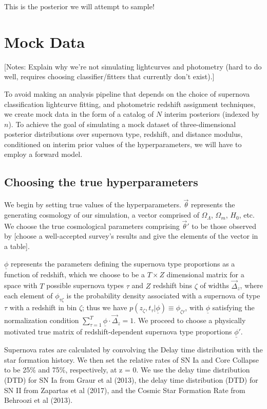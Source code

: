 \documentclass[12pt, onecolumn]{emulateapj}
\newcommand{\textul}{\underline}
\begin{document}
This is the posterior we will attempt to sample!

\section{Mock Data}
\label{sec:data}

[Notes: Explain why we're not simulating lightcurves and photometry (hard to do well, requires choosing classifier/fitters that currently don't exist).]

To avoid making an analysis pipeline that depends on the choice of supernova classification lightcurve fitting, and photometric redshift assignment techniques, we create mock data in the form of a catalog of $N$ interim posteriors (indexed by $n$).  To achieve the goal of simulating a mock dataset of three-dimensional posterior distributions over supernova type, redshift, and distance modulus, conditioned on interim prior values of the hyperparameters, we will have to employ a forward model.

\subsection{Choosing the true hyperparameters}
\label{sec:true_hypers}

We begin by setting true values of the hyperparameters.  $\vec{\theta}$ represents the generating cosmology of our simulation, a vector comprised of $\Omega_{\Lambda}$, $\Omega_{m}$, $H_{0}$, etc.  We choose the true cosmological parameters comprising $\vec{\theta}'$ to be those observed by [choose a well-accepted survey's results and give the elements of the vector in a table].  

$\textul{\phi}$ represents the parameters defining the supernova type proportions as a function of redshift, which we choose to be a $T\times Z$ dimensional matrix for a space with $T$ possible supernova types $\tau$ and $Z$ redshift bins $\zeta$ of widths $\vec{\Delta}_{z}$, where each element of $\phi_{\tau\zeta}$ is the probability density associated with a supernova of type $\tau$ with a redshift in bin $\zeta$; thus we have $p(z_{\zeta}, t_{\tau} | \textul{\phi}) \equiv \phi_{\zeta\tau}$, with $\textul{\phi}$ satisfying the normalization condition $\sum_{\tau=1}^{T}\textul{\phi}\cdot\vec{\Delta}_{z}=1$.  We proceed to choose a physically motivated true matrix of redshift-dependent supernova type proportions $\textul{\phi}'$.

Supernova rates are calculated by convolving the Delay time distribution with the star formation history. We then set the relative rates of SN Ia and Core Collapse to be 25\% and 75\%, respectively, at z = 0. We use the delay time distribution (DTD) for SN Ia from Graur et al (2013), the delay time distribution (DTD) for SN II from Zapartas et al (2017), and the Cosmic Star Formation Rate from Behroozi et al (2013).
\end{document}
